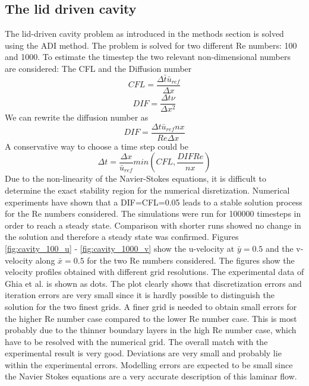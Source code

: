 \subsection{The lid driven cavity}
The lid-driven cavity problem as introduced in the methods section is solved using the ADI method. The problem is solved for two different Re numbers: 100 and 1000.  To estimate the timestep the two relevant non-dimensional numbers are considered: The CFL and the Diffusion number
\begin{equation}
CFL = \frac{\Delta \bar{t}\bar{u}_{ref}}{\Delta x}
\end{equation} 
\begin{equation}
DIF = \frac{\Delta \bar{t} \nu}{\Delta x^2}
\end{equation}
We can rewrite the diffusion number as 
\begin{equation}
DIF = \frac{\Delta t \bar{u}_{ref} nx}{Re \Delta x}
\end{equation}
A conservative way to choose a time step could be
\begin{equation}
\Delta t = \frac{\Delta x}{\bar{u}_{ref}} min\left(CFL,\frac{DIF Re}{nx}\right)
\end{equation} 
Due to the non-linearity of the Navier-Stokes equations, it is difficult to determine the exact stability region for the numerical disretization. Numerical experiments have shown that a DIF=CFL=0.05 leads to a stable solution process for the Re numbers considered. The simulations were run for 100000 timesteps in order to reach a steady state. Comparison with shorter runs showed no change in the solution and therefore a steady state was confirmed. Figures \ref{fig:cavity_100_u} - \ref{fig:cavity_1000_v} show the u-velocity at $\bar{y}=0.5$ and the v-velocity along $\bar{x}=0.5$ for the two Re numbers considered. The figures show the velocity profiles obtained with different grid resolutions. The experimental data of Ghia et al. is shown as dots. The plot clearly shows that discretization errors and iteration errors are very small since it is hardly possible to distinguish the solution for the two finest grids. A finer grid is needed to obtain small errors for the higher Re number case compared to the lower Re number case. This is most probably due to the thinner boundary layers in the high Re number case, which have to be resolved with the numerical grid. The overall match with the experimental result is very good. Deviations are very small and probably lie within the experimental errors. Modelling errors are expected to be small since the Navier Stokes equations are a very accurate description of this laminar flow.	
